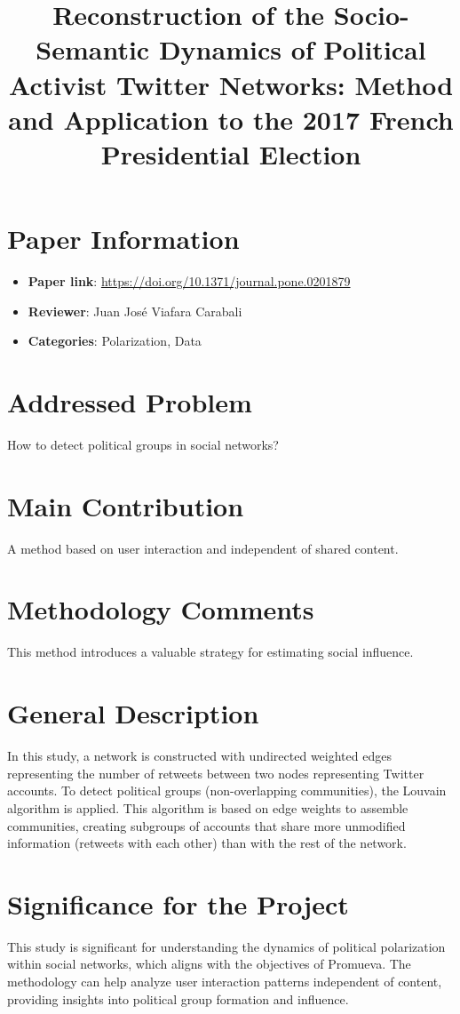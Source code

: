 \documentclass{article}
\title{Reconstruction of the Socio-Semantic Dynamics of Political Activist Twitter Networks: Method and Application to the 2017 French Presidential Election}
\author{}
\date{}
\begin{document}
\maketitle

\section*{Paper Information}
\begin{itemize}
    \item \textbf{Paper link}: \url{https://doi.org/10.1371/journal.pone.0201879}
    \item \textbf{Reviewer}: Juan José Viafara Carabali
    \item \textbf{Categories}: Polarization, Data
\end{itemize}

\section*{Addressed Problem}
How to detect political groups in social networks?

\section*{Main Contribution}
A method based on user interaction and independent of shared content.

\section*{Methodology Comments}
This method introduces a valuable strategy for estimating social influence.

\section*{General Description}
In this study, a network is constructed with undirected weighted edges representing the number of retweets between two nodes representing Twitter accounts. To detect political groups (non-overlapping communities), the Louvain algorithm is applied. This algorithm is based on edge weights to assemble communities, creating subgroups of accounts that share more unmodified information (retweets with each other) than with the rest of the network.

\section*{Significance for the Project}
This study is significant for understanding the dynamics of political polarization within social networks, which aligns with the objectives of Promueva. The methodology can help analyze user interaction patterns independent of content, providing insights into political group formation and influence.
\end{document}
